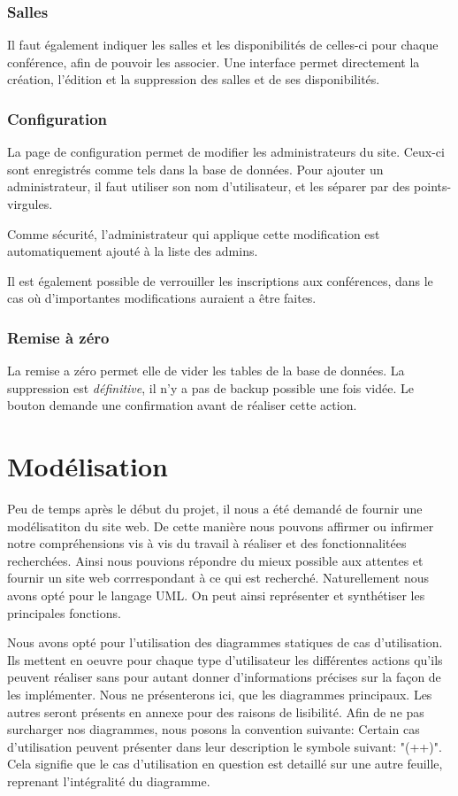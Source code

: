             \subsubsection{Salles}

Il faut également indiquer les salles et les disponibilités de celles-ci pour chaque conférence, afin de pouvoir les associer.
Une interface permet directement la création, l'édition et la suppression des salles et de ses disponibilités.

            \subsubsection{Configuration}

La page de configuration permet de modifier les administrateurs du site. Ceux-ci sont enregistrés comme tels dans la base de données.
Pour ajouter un administrateur, il faut utiliser son nom d'utilisateur, et les séparer par des points-virgules.

Comme sécurité, l'administrateur qui applique cette modification est automatiquement ajouté à la liste des admins.

Il est également possible de verrouiller les inscriptions aux conférences, dans le cas où d'importantes modifications
auraient a être faites.

            \subsubsection{Remise à zéro}
La remise a zéro permet elle de vider les tables de la base de données. La suppression est \emph{définitive}, il n'y a pas de
backup possible une fois vidée. Le bouton demande une confirmation avant de réaliser cette action.

    \section{Modélisation}
Peu de temps après le début du projet, il nous a été demandé de fournir une modélisatiton du site web. De cette manière
nous pouvons affirmer ou infirmer notre compréhensions vis à vis du travail à réaliser et des fonctionnalitées recherchées.
Ainsi nous pouvions répondre du mieux possible aux attentes et fournir un site web corrrespondant à ce qui est recherché.
Naturellement nous avons opté pour le langage UML. On peut ainsi représenter et synthétiser les principales fonctions.

Nous avons opté pour l'utilisation des diagrammes statiques de cas d'utilisation. Ils mettent en oeuvre pour chaque type d'utilisateur les différentes actions qu'ils peuvent réaliser sans pour autant donner d'informations précises sur la façon de les implémenter.
Nous ne présenterons ici, que les diagrammes principaux. Les autres seront présents en annexe pour des raisons de lisibilité.
Afin de ne pas surcharger nos diagrammes, nous posons la convention suivante: Certain cas d'utilisation peuvent présenter 
dans leur description le symbole suivant: "(++)". Cela signifie que le cas d'utilisation en question est detaillé sur une autre feuille, reprenant l'intégralité du diagramme.


